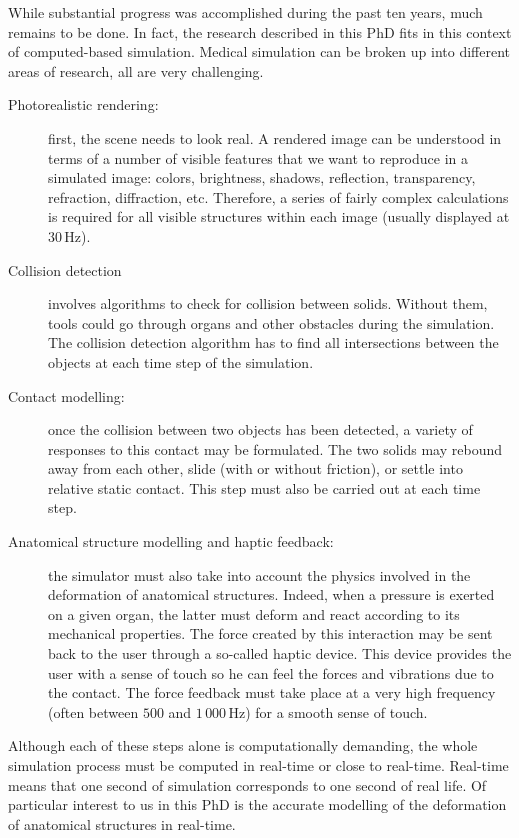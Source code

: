 While substantial progress was accomplished during the past ten years, much remains to be done. In fact, the research described in this PhD fits in this context of computed-based simulation. Medical simulation can be broken up into different areas of research, all are very challenging.
%
\begin{description}
\item[Photorealistic rendering:] first, the scene needs to look real. A rendered image can be understood in terms of a number of visible features that we want to reproduce in a simulated image: colors, brightness, shadows, reflection, transparency, refraction, diffraction, etc. Therefore, a series of fairly complex calculations is required for all visible structures within each image (usually displayed at $30\,$Hz). 
\item[Collision detection] involves algorithms to check for collision between solids. Without them, tools could go through organs and other obstacles during the simulation. The collision detection algorithm has to find all intersections between the objects at each time step of the simulation. 
\item[Contact modelling:] once the collision between two objects has been detected, a variety of responses to this contact may be formulated. The two solids may rebound away from each other, slide (with or without friction), or settle into relative static contact. This step must also be carried out at each time step. 
\item[Anatomical structure modelling and haptic feedback:] the simulator must also take into account the physics involved in the deformation of anatomical structures. Indeed, when a pressure is exerted on a given organ, the latter must deform and react according to its mechanical properties. The force created by this interaction may be sent back to the user through a so-called haptic device. This device provides the user with a sense of touch so he can feel the forces and vibrations due to the contact. The force feedback must take place at a very high frequency (often between $ 500 $ and $ 1\,000\,$Hz) for a smooth sense of touch. 
\end{description}
%
Although each of these steps alone is computationally demanding, the whole simulation process must be computed in real-time or close to real-time. Real-time means that one second of simulation corresponds to one second of real life. Of particular interest to us in this PhD is the accurate modelling of the deformation of anatomical structures in real-time. 

